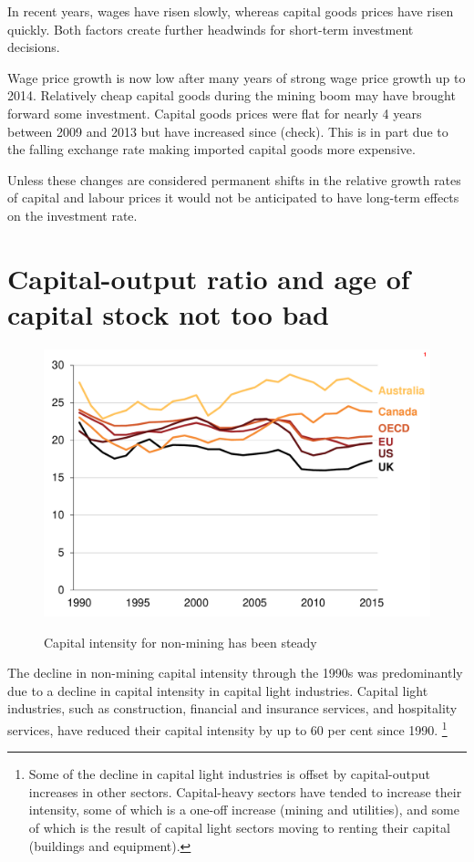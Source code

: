 In recent years, wages have risen slowly, whereas capital goods prices have risen quickly. Both factors create further headwinds for short-term investment decisions.

Wage price growth is now low after many years of strong wage price growth up to 2014. Relatively cheap capital goods during the mining boom may have brought forward some investment. Capital goods prices were flat for nearly 4 years between 2009 and 2013 but have increased since (check). This is in part due to the falling exchange rate making imported capital goods more expensive.

Unless these changes are considered permanent shifts in the relative growth rates of capital and labour prices it would not be anticipated to have long-term effects on the investment rate. 

\section{Capital-output ratio and age of capital stock not too bad}

\begin{figure}[p] 
 \caption{Capital intensity for non-mining has been steady}
 \includegraphics[page=8]{atlas/Ch2.pdf}\label{fig:capout}

\end{figure}

The decline in non-mining capital intensity through the 1990s was predominantly due to a decline in capital intensity in capital light industries. Capital light industries, such as construction, financial and insurance services, and hospitality services, have reduced their capital intensity by up to 60 per cent since 1990. \footnote{Some of the decline in capital light industries is offset by capital-output increases in other sectors. Capital-heavy sectors have tended to increase their intensity, some of which is a one-off increase (mining and utilities), and some of which is the result of capital light sectors moving to renting their capital (buildings and equipment).}

